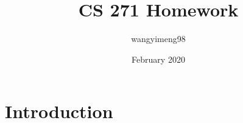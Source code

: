 \documentclass{article}
\title{CS 271 Homework}
\author{wangyimeng98 }
\date{February 2020}
\begin{document}
\maketitle

\section{Introduction}
\end{document}

